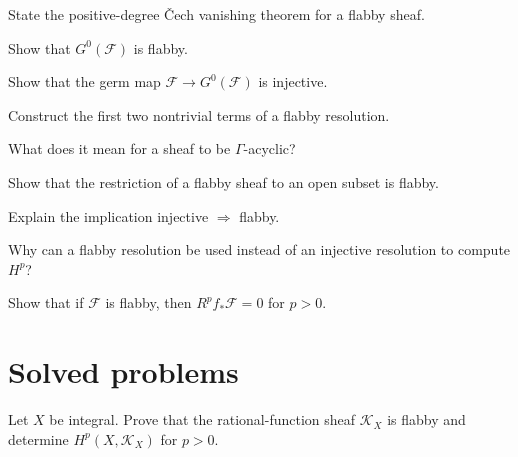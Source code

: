 \begin{exercise}\label{exr:vi46-16}
State the positive-degree \v{C}ech vanishing theorem for a flabby sheaf.
\end{exercise}

\begin{exercise}\label{exr:vi46-17}
Show that $G^0(\mathcal F)$ is flabby.
\end{exercise}

\begin{exercise}\label{exr:vi46-18}
Show that the germ map $\mathcal F\to G^0(\mathcal F)$ is injective.
\end{exercise}

\begin{exercise}\label{exr:vi46-19}
Construct the first two nontrivial terms of a flabby resolution.
\end{exercise}

\begin{exercise}\label{exr:vi46-20}
What does it mean for a sheaf to be $\Gamma$-acyclic?
\end{exercise}

\begin{exercise}\label{exr:vi46-21}
Show that the restriction of a flabby sheaf to an open subset is flabby.
\end{exercise}

\begin{exercise}\label{exr:vi46-22}
Explain the implication injective $\Rightarrow$ flabby.
\end{exercise}

\begin{exercise}\label{exr:vi46-23}
Why can a flabby resolution be used instead of an injective resolution to compute $H^p$?
\end{exercise}

\begin{exercise}\label{exr:vi46-24}
Show that if $\mathcal F$ is flabby, then $R^pf_*\mathcal F=0$ for $p>0$.
\end{exercise}

\ifdefined\IncludeExerciseHints

\fi
\ifdefined\IncludeExerciseSolutions

\fi

\section{Solved problems}
\begin{problem}\label{prob:vi46-01}
Let $X$ be integral. Prove that the rational-function sheaf $\mathcal K_X$ is flabby and determine $H^p(X,\mathcal K_X)$ for $p>0$.
\end{problem}

